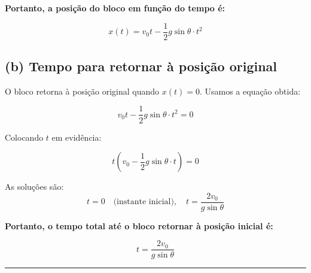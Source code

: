 \documentclass[a4paper,12pt]{article}
\begin{document}
\begin{flushleft}
\textbf{Portanto, a posição do bloco em função do tempo é:}

\[
\boxed{x(t) = v_0 t - \frac{1}{2} g \sin\theta \cdot t^2}
\]

\vspace{0.5cm}
\subsection*{(b) \colorbox{yellow!20}{Tempo para retornar à posição original}}

O bloco retorna à posição original quando \(x(t) = 0\). Usamos a equação obtida:

\[
v_0 t - \frac{1}{2} g \sin\theta \cdot t^2 = 0
\]

Colocando \(t\) em evidência:

\[
t \left(v_0 - \frac{1}{2} g \sin\theta \cdot t\right) = 0
\]

As soluções são:
\[
t = 0 \quad \text{(instante inicial)}, \quad t = \frac{2v_0}{g \sin\theta}
\]

\textbf{Portanto, o tempo total até o bloco retornar à posição inicial é:}

\[
\boxed{t = \frac{2v_0}{g \sin\theta}}
\]

\end{flushleft}

\noindent\rule{\linewidth}{0.4pt}\\
\end{document}
